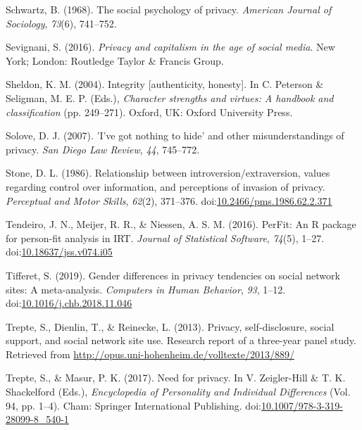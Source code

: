 \documentclass[man,floatsintext]{apa6}
\begin{document}
\leavevmode\hypertarget{ref-Schwartz.1968}{}%
Schwartz, B. (1968). The social psychology of privacy. \emph{American Journal of Sociology}, \emph{73}(6), 741--752.

\leavevmode\hypertarget{ref-Sevignani.2016}{}%
Sevignani, S. (2016). \emph{Privacy and capitalism in the age of social media}. New York; London: Routledge Taylor \& Francis Group.

\leavevmode\hypertarget{ref-Sheldon.2004}{}%
Sheldon, K. M. (2004). Integrity {[}authenticity, honesty{]}. In C. Peterson \& Seligman, M. E. P. (Eds.), \emph{Character strengths and virtues: A handbook and classification} (pp. 249--271). Oxford, UK: Oxford University Press.

\leavevmode\hypertarget{ref-Solove.2007}{}%
Solove, D. J. (2007). 'I've got nothing to hide' and other misunderstandings of privacy. \emph{San Diego Law Review}, \emph{44}, 745--772.

\leavevmode\hypertarget{ref-Stone.1986}{}%
Stone, D. L. (1986). Relationship between introversion/extraversion, values regarding control over information, and perceptions of invasion of privacy. \emph{Perceptual and Motor Skills}, \emph{62}(2), 371--376. doi:\href{https://doi.org/10.2466/pms.1986.62.2.371}{10.2466/pms.1986.62.2.371}

\leavevmode\hypertarget{ref-R-PerFit}{}%
Tendeiro, J. N., Meijer, R. R., \& Niessen, A. S. M. (2016). PerFit: An R package for person-fit analysis in IRT. \emph{Journal of Statistical Software}, \emph{74}(5), 1--27. doi:\href{https://doi.org/10.18637/jss.v074.i05}{10.18637/jss.v074.i05}

\leavevmode\hypertarget{ref-Tifferet.2019}{}%
Tifferet, S. (2019). Gender differences in privacy tendencies on social network sites: A meta-analysis. \emph{Computers in Human Behavior}, \emph{93}, 1--12. doi:\href{https://doi.org/10.1016/j.chb.2018.11.046}{10.1016/j.chb.2018.11.046}

\leavevmode\hypertarget{ref-Trepte.2013a}{}%
Trepte, S., Dienlin, T., \& Reinecke, L. (2013). Privacy, self-disclosure, social support, and social network site use. Research report of a three-year panel study. Retrieved from \url{http://opus.uni-hohenheim.de/volltexte/2013/889/}

\leavevmode\hypertarget{ref-Trepte.2017d}{}%
Trepte, S., \& Masur, P. K. (2017). Need for privacy. In V. Zeigler-Hill \& T. K. Shackelford (Eds.), \emph{Encyclopedia of Personality and Individual Differences} (Vol. 94, pp. 1--4). Cham: Springer International Publishing. doi:\href{https://doi.org/10.1007/978-3-319-28099-8_540-1}{10.1007/978-3-319-28099-8\_540-1}
\end{document}
